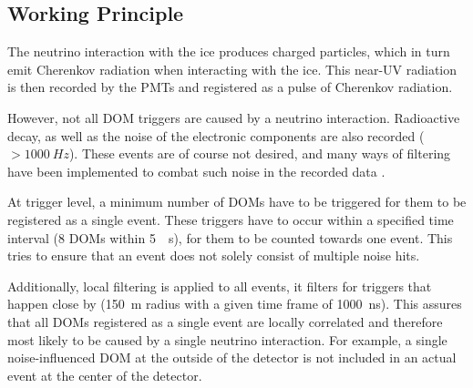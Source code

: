\documentclass[a4paper,10pt]{scrartcl}
\begin{document}
\subsection{Working Principle}
\label{working-principle}

The neutrino interaction with the ice produces charged particles, which in turn emit Cherenkov radiation when interacting with the ice.
This near-UV radiation is then recorded by the PMTs and registered as a pulse of Cherenkov radiation.

However, not all DOM triggers are caused by a neutrino interaction.
Radioactive decay, as well as the noise of the electronic components are also recorded ($> \SI{1000}{Hz}$).
These events are of course not desired, and many ways of filtering have been implemented to combat such noise in the recorded data \cite{rasmus-master}.

At trigger level, a minimum number of DOMs have to be triggered for them to be registered as a single event.
These triggers have to occur within a specified time interval (8 DOMs within \SI{5}{\mu s}), for them to be counted towards one event.
This tries to ensure that an event does not solely consist of multiple noise hits.

Additionally, local filtering is applied to all events, it filters for triggers that happen close by (\SI{150}{m} radius with a given time frame of \SI{1000}{ns}).
This assures that all DOMs registered as a single event are locally correlated and therefore most likely to be caused by a single neutrino interaction.
For example, a single noise-influenced DOM at the outside of the detector is not included in an actual event at the center of the detector.
\end{document}

